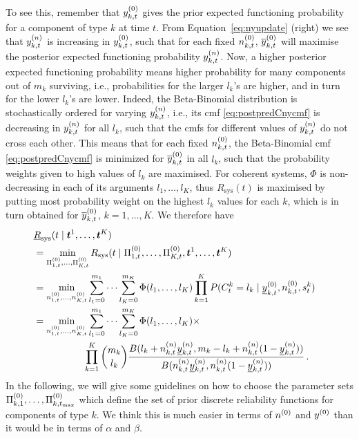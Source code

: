 \documentclass[12pt, a4paper]{elsarticle}
\newcommand{\bs}[1]{\boldsymbol{#1}}
\renewcommand{\vec}[1]{{\bs#1}}
\newcommand{\ul}[1]{\underline{#1}}
\newcommand{\Rsys}{R_\text{sys}}
\newcommand{\lRsys}{\ul{R}_\text{sys}}
\def\tmax{t_\text{max}}
\begin{document}
To see this,
remember that $y^{(0)}_{k,t}$ gives the prior expected functioning probability for a component of type $k$ at time $t$.
From Equation~\eqref{eq:nyupdate} (right) we see that $y^{(n)}_{k,t}$ is increasing in $y^{(0)}_{k,t}$,
such that for each fixed $n^{(0)}_{k,t}$, $\overline{y}^{(0)}_{k,t}$ will maximise the posterior expected functioning probability $y^{(n)}_{k,t}$.
%
Now, a higher posterior expected functioning probability means
higher probability for many components out of $m_k$ surviving,
i.e., probabilities for the larger $l_k$'s are higher, and in turn for the lower $l_k$'s are lower.
Indeed, the Beta-Binomial distribution is stochastically ordered for varying $y^{(n)}_{k,t}$, i.e.,
its cmf \eqref{eq:postpredCnycmf} is decreasing in $y^{(n)}_{k,t}$ for all $l_k$,
such that the cmfs for different values of $y^{(n)}_{k,t}$ do not cross each other.
This means that for each fixed $n^{(0)}_{k,t}$, the Beta-Binomial cmf \eqref{eq:postpredCnycmf} is minimized for $\overline{y}^{(0)}_{k,t}$ in all $l_k$,
such that the probability weights given to high values of $l_k$ are maximised. %
For coherent systems, $\Phi$ is non-decreasing in each of its arguments $l_1,\ldots,l_K$,
thus $\Rsys(t)$ is maximised by putting most probability weight on the highest $l_k$ values for each $k$,
which is in turn obtained for $\overline{y}^{(0)}_{k,t}$, $k=1,\ldots,K$.
We therefore have
%
\begin{align}
\lefteqn{\lRsys(t \mid \vec{t}^1, \ldots, \vec{t}^K)} \nonumber \\
 &= \min_{\PtZi{1}, \ldots, \PtZi{K}} \Rsys(t \mid \PtZi{1}, \ldots, \PtZi{K}, \vec{t}^1, \ldots, \vec{t}^K) \nonumber \\
 &= \min_{\nz_{1,t},\ldots,\nz_{K,t}} 
    \sum_{l_1=0}^{m_1} \cdots \sum_{l_K=0}^{m_K} \Phi(l_1, \ldots, l_K)
                                                 \prod_{k=1}^K P(C^k_t = l_k \mid \yktzl, \nktz, s^k_t) \nonumber \\
 &= \min_{\nz_{1,t},\ldots,\nz_{K,t}} 
    \sum_{l_1=0}^{m_1} \cdots \sum_{l_K=0}^{m_K} \Phi(l_1, \ldots, l_K) \times \nonumber \\ & \hspace*{12ex}
    \prod_{k=1}^K {m_k \choose l_k} \frac{B(l_k + \nn_{k,t}\ynl_{k,t}, m_k - l_k + \nn_{k,t}(1-\ynl_{k,t}))}
                                         {B(\nn_{k,t}\ynl_{k,t}, \nn_{k,t}(1-\ynl_{k,t}))} \,. \label{eq:LwrSysPost}
\end{align}
In the following, we will give some guidelines on how to choose the parameter sets $\PkZi{1}, \ldots, \PkZi{\tmax}$
which define the set of prior discrete reliability functions for components of type $k$.
We think this is much easier in terms of $n^{(0)}$ and $y^{(0)}$ than it would be in terms of $\alpha$ and $\beta$.
\end{document}
